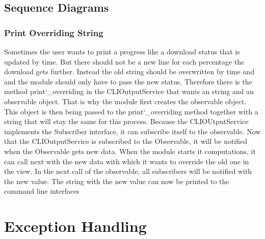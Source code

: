 \documentclass[parskip=full]{scrartcl}
\begin{document}
\newpage
\begin{figure}[h]
\begin{center}

\label{Command Parsing}
\end{center}
\end{figure}
\newpage

\subsection{Sequence Diagrams}

\subsubsection{Print Overriding String}

Sometimes the user wants to print a progress like a download status that is updated by time.
But there should not be a new line for each percentage the download gets further.
Instead the old string should be overwritten by time and and the module should only have to pass the new status.
Therefore there is the method print\char`_overriding in the CLIOutputService that wants an string and an observable object.
That is why the module first creates the observable object.
This object is then being passed to the print\char`_overriding method together with a string that will stay the same for this process.
Because the CLIOUtputService implements the Subscriber interface, it can subscribe itself to the observable.
Now that the CLIOutputService is subscribed to the Observable, it will be notified when the Observable gets new data.
When the module starts it computations, it can call next with the new data with which it wants to override the old one in the view.
In the next call of the observable, all subscribers will be notified with the new value.
The string with the new value can now be printed to the command line interfaces

\newpage
\begin{figure}[h]
\begin{center}

\label{Print Overriding String}
\end{center}
\end{figure}
\newpage

\section{Exception Handling}
\end{document}
